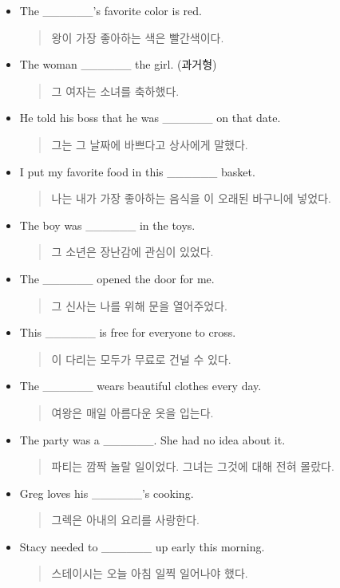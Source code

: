 \documentclass{article}
\begin{document}
\begin{addmargin}[1em]{1em}
\begin{itemize}
\begin{quote}
    \end{quote}
    \item The \_\_\_\_\_\_'s favorite color is red.
    \begin{quote}
    왕이 가장 좋아하는 색은 빨간색이다.
    \end{quote}
    \item The woman \_\_\_\_\_\_ the girl. (과거형)
    \begin{quote}
    그 여자는 소녀를 축하했다.
    \end{quote}
    \newpage
    \item He told his boss that he was \_\_\_\_\_\_ on that date.
    \begin{quote}
    그는 그 날짜에 바쁘다고 상사에게 말했다.
    \end{quote}
    \item I put my favorite food in this \_\_\_\_\_\_ basket.
    \begin{quote}
    나는 내가 가장 좋아하는 음식을 이 오래된 바구니에 넣었다.
    \end{quote}
    \item The boy was \_\_\_\_\_\_ in the toys.
    \begin{quote}
    그 소년은 장난감에 관심이 있었다.
    \end{quote}
    \item The \_\_\_\_\_\_ opened the door for me.
    \begin{quote}
    그 신사는 나를 위해 문을 열어주었다.
    \end{quote}
    \item This \_\_\_\_\_\_ is free for everyone to cross.
    \begin{quote}
    이 다리는 모두가 무료로 건널 수 있다.
    \end{quote}
    \item The \_\_\_\_\_\_ wears beautiful clothes every day.
    \begin{quote}
    여왕은 매일 아름다운 옷을 입는다.
    \end{quote}
    \item The party was a \_\_\_\_\_\_. She had no idea about it.
    \begin{quote}
    파티는 깜짝 놀랄 일이었다. 그녀는 그것에 대해 전혀 몰랐다.
    \end{quote}
    \item Greg loves his \_\_\_\_\_\_'s cooking.
    \begin{quote}
    그렉은 아내의 요리를 사랑한다.
    \end{quote}
    \item Stacy needed to \_\_\_\_\_\_ up early this morning.
    \begin{quote}
    스테이시는 오늘 아침 일찍 일어나야 했다.
    \end{quote}
\end{itemize}
\end{addmargin}
\end{document}
